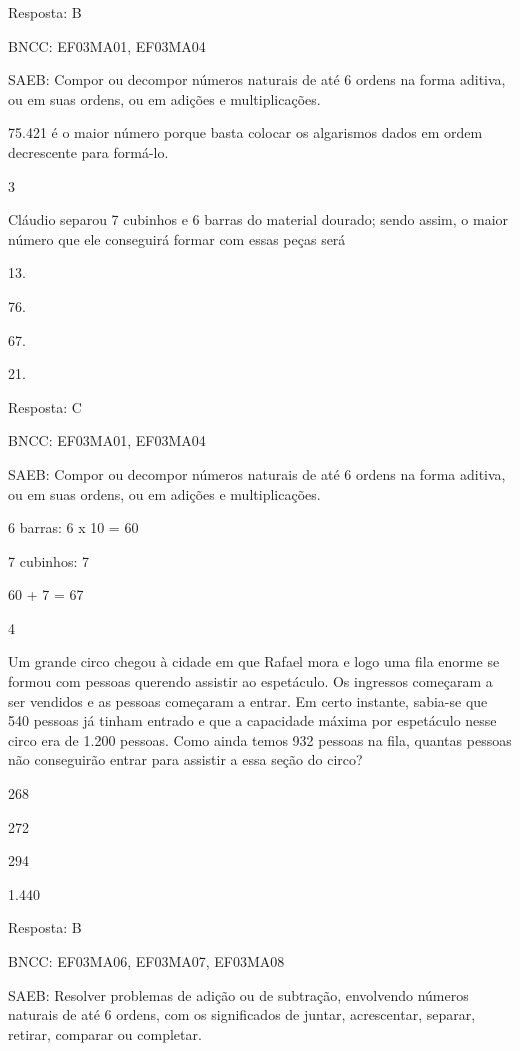 \begin{escolha}
{\begin{escolha}
{Resposta: B

BNCC: EF03MA01, EF03MA04

SAEB: Compor ou decompor números naturais de até 6 ordens na
forma aditiva, ou em suas ordens, ou em adições e multiplicações.

75.421 é o maior número porque basta colocar os algarismos dados em ordem decrescente para
formá-lo.

\num{3}

Cláudio separou 7 cubinhos e 6 barras do material dourado; sendo assim,
o maior número que ele conseguirá formar com essas peças será

\begin{escolha}
\item
  13.
\item
  76.
\item
  67.
\item
  21.
\end{escolha}

Resposta: C

BNCC: EF03MA01, EF03MA04

SAEB: Compor ou decompor números naturais de até 6 ordens na
forma aditiva, ou em suas ordens, ou em adições e multiplicações.

6 barras: 6 x 10 = 60

7 cubinhos: 7

60 + 7 = 67

\num{4}

Um grande circo chegou à cidade em que Rafael mora e logo uma fila
enorme se formou com pessoas querendo assistir ao espetáculo. Os
ingressos começaram a ser vendidos e as pessoas começaram a entrar. Em certo instante, sabia-se que 540 pessoas já tinham
entrado e que a capacidade máxima por espetáculo nesse circo era de 1.200 pessoas. Como ainda temos 932 pessoas na fila, quantas pessoas não
conseguirão entrar para assistir a essa seção do circo?

\begin{escolha}
\item
  268
\item
  272
\item
  294
\item
  1.440
\end{escolha}

Resposta: B

BNCC: EF03MA06, EF03MA07, EF03MA08

SAEB: Resolver problemas de adição ou de subtração,
envolvendo números naturais de até 6 ordens, com os significados de
juntar, acrescentar, separar, retirar, comparar ou completar.

}
\end{escolha}}
\end{escolha}
